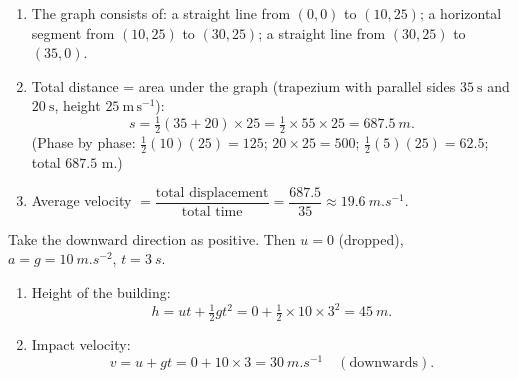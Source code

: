 \documentclass[11pt]{article}
\begin{document}
\begin{corrige}
\begin{enumerate}
\item The graph consists of: a straight line from $(0,0)$ to $(10,25)$; a horizontal segment from $(10,25)$ to $(30,25)$; a straight line from $(30,25)$ to $(35,0)$.
\begin{center}
\end{center}
\item Total distance = area under the graph (trapezium with parallel sides $35\ \mathrm{s}$ and $20\ \mathrm{s}$, height $25\ \mathrm{m\,s^{-1}}$):
\[
s = \tfrac12(35+20)\times 25 = \tfrac12 \times 55 \times 25 = \SI{687.5}{m}.
\]
(Phase by phase: $\tfrac12(10)(25)=125$; $20\times 25 = 500$; $\tfrac12(5)(25)=62.5$; total $687.5$ m.)
\item Average velocity $= \dfrac{\text{total displacement}}{\text{total time}} = \dfrac{687.5}{35} \approx \SI{19.6}{m.s^{-1}}$.
\end{enumerate}
\end{corrige}

\begin{corrige}
Take the downward direction as positive. Then $u = 0$ (dropped), $a = g = \SI{10}{m.s^{-2}}$, $t = \SI{3}{s}$.
\begin{enumerate}
\item Height of the building:
\[
h = ut + \tfrac12 gt^2 = 0 + \tfrac12 \times 10 \times 3^2 = \SI{45}{m}.
\]
\item Impact velocity:
\[
v = u + gt = 0 + 10 \times 3 = \SI{30}{m.s^{-1}} \quad (\text{downwards}).
\]
\end{enumerate}
\end{corrige}
\end{document}
